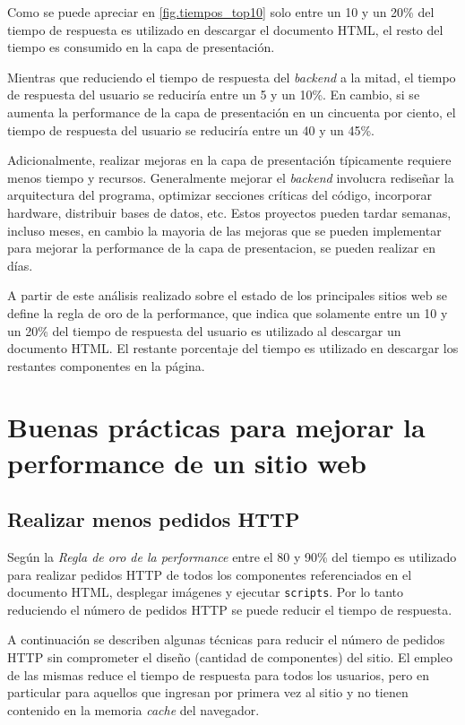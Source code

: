 \documentclass[a4paper,12pt]{report}
\begin{document}
Como se puede apreciar en \ref{fig.tiempos_top10} solo entre un 10 y un 20\% del tiempo de respuesta es utilizado en descargar el documento HTML, el resto
del tiempo es consumido en la capa de presentación.

Mientras que reduciendo el tiempo de respuesta del \emph{backend} a la mitad, el tiempo de respuesta del usuario se reduciría entre un 5 y un 10\%. En cambio,
si se aumenta la performance de la capa de presentación en un cincuenta por ciento, el tiempo de respuesta del usuario se reduciría entre un 40 y un 45\%.

Adicionalmente, realizar mejoras en la capa de presentación típicamente requiere menos tiempo y recursos. Generalmente mejorar el \emph{backend} involucra rediseñar la arquitectura del
programa, optimizar secciones críticas del código, incorporar hardware, distribuir bases de datos, etc. Estos proyectos pueden tardar semanas, incluso meses, en cambio la
mayoria de las mejoras que se pueden implementar para mejorar la performance de la capa de presentacion, se pueden realizar en días.

A partir de este análisis realizado sobre el estado de los principales sitios web se define la regla de oro de la performance, que indica que solamente entre un 10 y un 20\% 
del tiempo de respuesta del usuario es utilizado al descargar un documento HTML. El restante porcentaje del tiempo es utilizado en descargar los restantes
componentes en la página.

\section{Buenas prácticas para mejorar la performance de un sitio web}

\subsection{Realizar menos pedidos HTTP}

Según la \emph{Regla de oro de la performance} entre el 80 y 90\% del tiempo es utilizado para realizar pedidos HTTP de todos
los componentes referenciados en el documento HTML, desplegar imágenes y ejecutar \texttt{scripts}. Por lo tanto reduciendo el número de pedidos
HTTP se puede reducir el tiempo de respuesta.

A continuación se describen algunas técnicas para reducir el número de pedidos HTTP sin comprometer el diseño (cantidad de componentes) del sitio.
El empleo de las mismas reduce el tiempo de respuesta para todos los usuarios, pero en particular para aquellos que ingresan por primera vez al sitio y no tienen contenido
en la memoria \emph{cache} del navegador.
\end{document}
